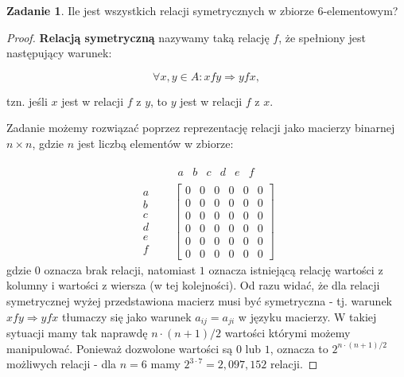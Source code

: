\documentclass[11pt]{article}
\theoremstyle{definition}
\newtheorem{zadanie}{Zadanie}
\numberwithin{zadanie}{subsection}
\begin{document}
\begin{zadanie}
    Ile jest wszystkich relacji symetrycznych w zbiorze 6-elementowym?
\end{zadanie}
\begin{proof}
    \textbf{Relacją symetryczną} nazywamy taką relację $f$, że spełniony jest następujący warunek:

    $$\forall x,y\in A: x f y \Rightarrow y f x,$$

    tzn. jeśli $x$ jest w relacji $f$ z $y$, to $y$ jest w relacji $f$ z $x$.

    Zadanie możemy rozwiązać poprzez reprezentację relacji jako macierzy binarnej $n\times n$, gdzie $n$ jest liczbą elementów w zbiorze:

    \begin{align*}
         &
        \begin{matrix}
            a & b & c & d & e & f
        \end{matrix}    \\
        \begin{matrix}
            a \\b\\c\\d\\e\\f
        \end{matrix}
        \quad
         & \begin{bmatrix}
            0 & 0 & 0 & 0 & 0 & 0 \\
            0 & 0 & 0 & 0 & 0 & 0 \\
            0 & 0 & 0 & 0 & 0 & 0 \\
            0 & 0 & 0 & 0 & 0 & 0 \\
            0 & 0 & 0 & 0 & 0 & 0 \\
            0 & 0 & 0 & 0 & 0 & 0
        \end{bmatrix}
    \end{align*}
    gdzie $0$ oznacza brak relacji, natomiast $1$ oznacza istniejącą relację wartości z kolumny i wartości z wiersza (w tej kolejności). Od razu widać, że dla relacji symetrycznej wyżej przedstawiona macierz musi być symetryczna - tj. warunek $xfy\Rightarrow yfx$ tłumaczy się jako warunek $a_{ij} = a_{ji}$ w języku macierzy. W takiej sytuacji mamy tak naprawdę $n\cdot(n+1)/2$ wartości którymi możemy manipulować. Ponieważ dozwolone wartości są $0$ lub $1$, oznacza to $2^{n\cdot(n+1)/2}$ możliwych relacji - dla $n = 6$ mamy $2^{3\cdot7} = 2,097,152$ relacji.
\end{proof}
\end{document}
